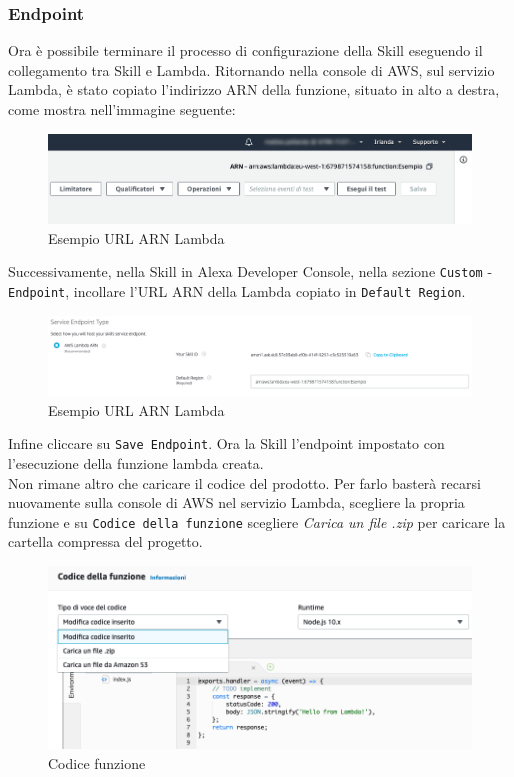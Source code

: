 \subsubsection{Endpoint}
\label{endpoint}
Ora è possibile terminare il processo di configurazione della Skill eseguendo il collegamento tra Skill e Lambda. Ritornando nella console di AWS, sul servizio Lambda, è stato copiato l'indirizzo ARN della funzione, situato in alto a destra, come mostra nell'immagine seguente:
\begin{figure}[H]
	\centering
	\includegraphics[width=13cm]{immagini/aws-lambda3.png}
	\caption{Esempio URL ARN Lambda}
\end{figure}
\noindent Successivamente, nella Skill in Alexa Developer Console, nella sezione \texttt{Custom} - \texttt{Endpoint}, incollare l'URL ARN della Lambda copiato in \texttt{Default Region}.
\begin{figure}[H]
	\centering
	\includegraphics[width=13cm]{immagini/aws-lambda4.png}
	\caption{Esempio URL ARN Lambda}
\end{figure}
\noindent Infine cliccare su \texttt{Save Endpoint}. Ora la Skill l'endpoint impostato con l'esecuzione della funzione lambda creata.\\
Non rimane altro che caricare il codice del prodotto. Per farlo basterà recarsi nuovamente sulla console di AWS nel servizio Lambda, scegliere la propria funzione e su \texttt{Codice della funzione} scegliere \textit{Carica un file .zip} per caricare la cartella compressa del progetto.
\begin{figure}[H]
	\centering
	\includegraphics[width=13cm]{immagini/aws-lambda5.png}
	\caption{Codice funzione}
\end{figure}




